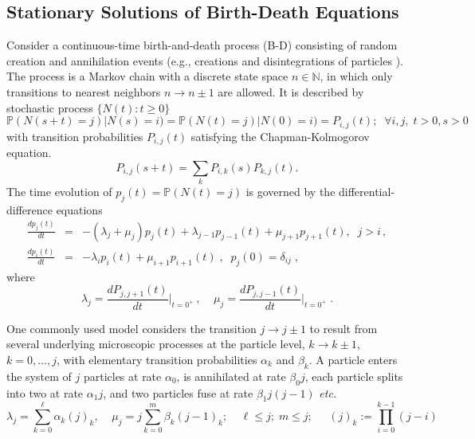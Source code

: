 \documentclass[a4paper,12pt]{amsart}
\newcommand{\N}{\mathbb{N}}
\theoremstyle{definition}
\theoremstyle{remark}
\begin{document}
\subsection{Stationary Solutions of Birth-Death Equations}
Consider a continuous-time birth-and-death process (B-D) consisting of random creation and annihilation events (e.g., creations and disintegrations of particles \cite{Feller1, Anderson}). The process is a Markov chain with a discrete state space $n\in \N$, in which only transitions to nearest neighbors $n\to n \pm 1$ are allowed. It is described by stochastic process $\{N(t): t \geq 0\}$
\[\mathbb P(N(s+t)=j)|N(s)=i)= \mathbb P(N(t)=j)|N(0)=i)=P_{i,j}(t); \;\; \forall i,j, \;t>0,s>0
\]
with transition probabilities $P_{i,j}(t)$ satisfying the Chapman-Kolmogorov equation.
\[P_{i,j}(s+t)=\sum_{k}P_{i,k}(s)P_{k,j}(t).
\]
The time evolution of $p_j(t)=\mathbb P (N(t)\!=\!j)$ is governed by the differential-difference equations 
\begin{eqnarray}\label{dd}
\frac{dp_{j}(t)}{dt}&=&-(\lambda_j +\mu_j) p_{j}(t) + \lambda_{j-1} p_{j-1}(t) +\mu_{j+1}p_{j+1}(t), \;\; j > i\,,
\\ \nonumber 
 \frac{dp_i(t)}{dt}&=&-\lambda_i  p_i(t) + \mu_{i+1} p_{i+1}(t)\;, \;\; p_j(0)=\delta_{ij}\;,
\end{eqnarray}
where 
\[    \lambda_j=\frac{dP_{j,j+1}(t)}{dt}\Big |_{t=0^{+}}\,, \;\;\;\;
    \mu_j=\frac{dP_{j,j-1}(t)}{dt}\Big |_{t=0^{+}}\;.
\]

One commonly used model considers the transition $j\to j\pm 1$ to result from several underlying microscopic processes at the particle level, $k \to k\pm 1$, $k=0,\ldots,j$, with elementary transition probabilities $\alpha_k$ and $\beta_k$. A particle enters the system of $j$ particles  at rate $\alpha_0$, is annihilated at rate $\beta_0 j$, each particle splits into two at rate $\alpha_1 j$, and two particles fuse at rate $\beta_1 j(j-1)$ {\it etc.} 
\begin{equation}
\label{albe}
\lambda_j  =\sum_{k=0}^{\ell} \alpha_k (j)_k, \; \;\;\;
\mu_j  =  j \sum_{k=0}^{m} \beta_k (j-1)_k; \; \;\;\; \ell \le j ;\; m \le j ;\;\;\;\;\; (j)_k \!:=\! \prod_{i=0}^{k-1} (j\!-\!i)
\end{equation}
\end{document}
